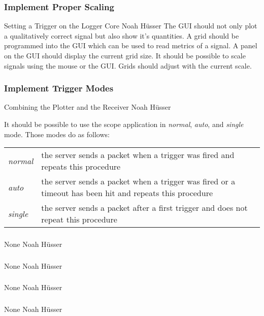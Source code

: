 \documentclass[a4paper,oneside]{alpenspecs/alpenspecs}
\begin{document}
\subsubsection{Implement Proper Scaling}
\label{subsec:frontend:}
\wpac
     {}
     {}
     {}
     {Setting a Trigger on the Logger Core}
     {}
     {Noah Hüsser}
     {%
         The GUI should not only plot a qualitatively correct signal but also show it's quantities.
         A grid should be programmed into the GUI which can be used to read metrics of a signal. A panel on the GUI should display the current grid size.
         It should be possible to scale signals using the mouse or the GUI. Grids should adjust with the current scale.
     }

\subsubsection{Implement Trigger Modes}
\label{subsec:frontend:}
\wpac
     {}
     {}
     {}
     {Combining the Plotter and the Receiver}
     {}
     {Noah Hüsser}
     {%
         It should be possible to use the scope application in \textit{normal}, \textit{auto}, and \textit{single} mode.
         Those modes do as follows:
         \begin{tabular}{l l}
            \textit{normal} & the server sends a packet when a trigger was fired and repeats this procedure \\
            \textit{auto} & the server sends a packet when a trigger was fired or a timeout has been hit and repeats this procedure \\
            \textit{single} & the server sends a packet after a first trigger and does not repeat this procedure
         \end{tabular}
     }

 \subsubsection{}
\label{subsec:frontend:}
\wpac
     {}
     {}
     {}
     {None}
     {}
     {Noah Hüsser}
     {%
         
     }

\subsubsection{}
\label{subsec:frontend:}
\wpac
     {}
     {}
     {}
     {None}
     {}
     {Noah Hüsser}
     {%
         
     }

\subsubsection{}
\label{subsec:frontend:}
\wpac
     {}
     {}
     {}
     {None}
     {}
     {Noah Hüsser}
     {%
         
     }

\subsubsection{}
\label{subsec:frontend:}
\wpac
     {}
     {}
     {}
     {None}
     {}
     {Noah Hüsser}
     {%
         
     }


\backmatter
\end{document}
